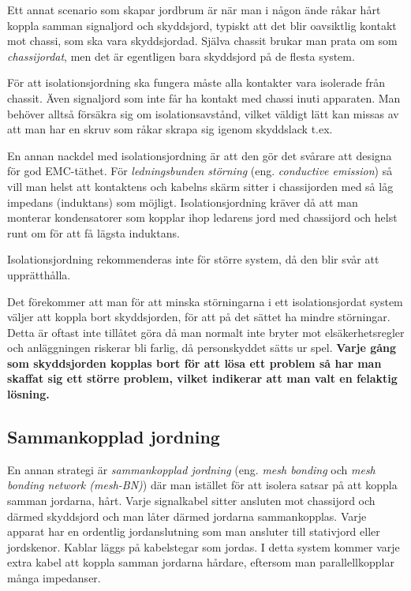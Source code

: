 Ett annat scenario som skapar jordbrum är när man i någon ände råkar hårt
koppla samman signaljord och skyddsjord, typiskt att det blir oavsiktlig
kontakt mot chassi, som ska vara skyddsjordad. Själva chassit brukar man
prata om som \emph{chassijordat}, men det är egentligen bara skyddsjord på de
flesta system.

För att isolationsjordning ska fungera måste alla kontakter vara isolerade
från chassit. Även signaljord som inte får ha kontakt med chassi inuti
apparaten. Man behöver alltså försäkra sig om isolationsavstånd, vilket
väldigt lätt kan missas av att man har en skruv som råkar skrapa sig igenom
skyddslack t.ex.

En annan nackdel med isolationsjordning är att den gör det svårare att designa
för god EMC-täthet. För \emph{ledningsbunden störning} (eng. \emph{conductive
	emission}) så vill man helst att kontaktens och kabelns skärm sitter i
chassijorden med så låg impedans (induktans) som möjligt. Isolationsjordning
kräver då att man monterar kondensatorer som kopplar ihop ledarens jord med
chassijord och helst runt om för att få lägsta induktans.

Isolationsjordning rekommenderas inte för större system, då den blir svår
att upprätthålla.

Det förekommer att man för att minska störningarna i ett isolationsjordat
system väljer att koppla bort skyddsjorden, för att på det sättet ha mindre
störningar. Detta är oftast inte tillåtet göra då man normalt inte bryter mot
elsäkerhetsregler och anläggningen riskerar bli farlig, då personskyddet
sätts ur spel. \textbf{Varje gång som skyddsjorden kopplas bort för att lösa ett
	problem så har man skaffat sig ett större problem, vilket indikerar att man
	valt en felaktig lösning.}

\subsection{Sammankopplad jordning}

En annan strategi är \emph{sammankopplad jordning} (eng. \emph{mesh bonding}
och \emph{mesh bonding network (mesh-BN)}) \cite[3.2.3]{K27-1991}
där man istället för att isolera satsar på att koppla samman jordarna, hårt.
Varje signalkabel sitter ansluten mot chassijord och därmed skyddsjord och
man låter därmed jordarna sammankopplas. Varje apparat har en ordentlig
jordanslutning som man ansluter till stativjord eller jordskenor. Kablar läggs
på kabelstegar som jordas. I detta system kommer varje extra kabel att koppla
samman jordarna hårdare, eftersom man parallellkopplar många impedanser.

